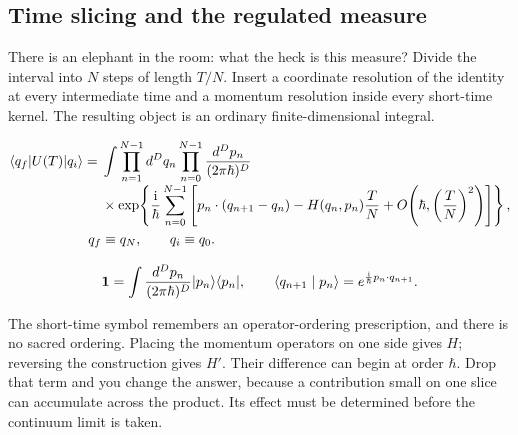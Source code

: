 \subsection{Time slicing and the regulated measure}

There is an elephant in the room: what the heck is this measure? Divide the interval into $N$ steps of length $T/N$. Insert a coordinate resolution of the identity at every intermediate time and a momentum resolution inside every short-time kernel. The resulting object is an ordinary finite-dimensional integral.

\begin{align}
  \langle q_f\rvert U(T)\lvert q_i\rangle
  ={}&\int\prod_{n=1}^{N-1}d^Dq_n
  \prod_{n=0}^{N-1}\frac{d^Dp_n}{(2\pi\hbar)^D}
  \nonumber\\[-1mm]
  &\times\exp\!\left\{\frac{\mathrm{i}}{\hbar}\sum_{n=0}^{N-1}
  \left[p_n\cdot(q_{n+1}-q_n)
  -H(q_n,p_n)\frac{T}{N}
  +O\!\left(\hbar,\left(\frac{T}{N}\right)^2\right)\right]\right\},
  \label{eq:253a-ch02-finite-phase-space-kernel}\\
  q_f&\equiv q_N,
  \qquad q_i\equiv q_0.
\end{align}

\begin{equation}
  \mathbf 1=\int\frac{d^Dp_n}{(2\pi\hbar)^D}\lvert p_n\rangle\langle p_n\rvert,
  \qquad
  \langle q_{n+1}\mid p_n\rangle=e^{\frac{\mathrm{i}}{\hbar}p_n\cdot q_{n+1}}.
  \label{eq:253a-ch02-momentum-resolution}
\end{equation}

The short-time symbol remembers an operator-ordering prescription, and there is no sacred ordering. Placing the momentum operators on one side gives $H$; reversing the construction gives $H'$. Their difference can begin at order $\hbar$. Drop that term and you change the answer, because a contribution small on one slice can accumulate across the product. Its effect must be determined before the continuum limit is taken.

